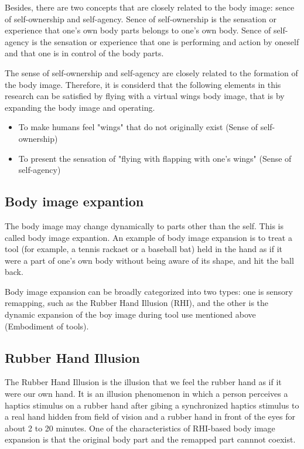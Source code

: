 \documentclass[letterpaper, 10 pt, conference]{ieeeconf}  %
\begin{document}
                Besides, there are two concepts that are closely related to the body image: sence of self-ownership and self-agency.
                Sence of self-ownership is the sensation or experience that one's own body parts belongs to one's own body.  
                Sence of self-agency is the sensation or experience that one is performing and action by oneself and that one is in control of the body parts.  
                
                The sense of self-ownership and self-agency are closely related to  the formation of the body image.  
                Therefore, it is considerd that the following elements in this research can be satisfied by flying with a virtual wings body image, that is by expanding the body image and operating.  

                \begin{itemize}
                        \item To make humans feel "wings" that do not originally exist (Sense of self-ownership)
                        \item To present the sensation of "flying with flapping with one's wings" (Sense of self-agency)
                \end{itemize}

        \subsection{Body image expantion}
                The body image may change dynamically to parts other than the self.  
                This is called body image expantion.  
                An example of body image expansion is to treat a tool (for example, a tennis rackaet or a baseball bat) held in the hand as if it were a part of one's own body without being aware of its shape, and hit the ball back\cite{botvinick1998rubber}.
                

                Body image expansion can be broadly categorized into two types: one is sensory remapping, such as the Rubber Hand Illusion (RHI), and the other is the dynamic expansion of the boy image during tool use mentioned above (Embodiment of tools).  

        \subsection{Rubber Hand Illusion}
                The Rubber Hand Illusion is the illusion that we feel the rubber hand as if it were our own hand.  
                It is an illusion phenomenon in which a person perceives a haptics stimulus on a rubber hand after gibing a synchronized haptics stimulus to a real hand hidden from field of vision and a rubber hand in front of the eyes for about 2 to 20 minutes.  
                One of the characteristics of RHI-based body image expansion is that the original body part and the remapped part cannnot coexist.
\end{document}
